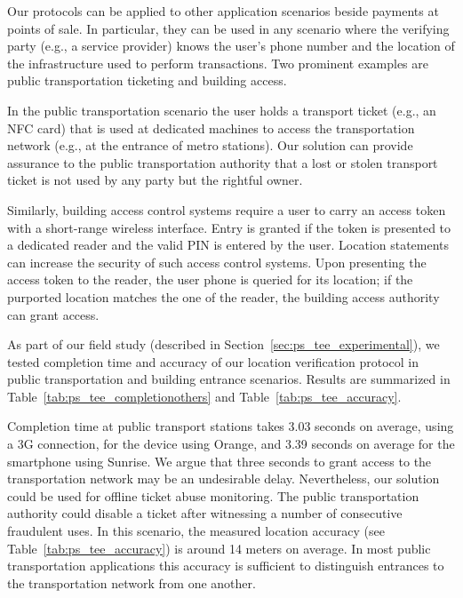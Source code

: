 Our protocols can be applied to other application scenarios beside payments at
points of sale.  In particular, they can be used in any scenario where the
verifying party (e.g., a service provider) knows the user's phone number and the
location of the infrastructure used to perform transactions.  Two prominent
examples are public transportation ticketing and building access.

In the public transportation scenario the user holds a transport ticket (e.g.,
an NFC card) that is used at dedicated machines to access the transportation
network (e.g., at the entrance of metro stations). Our solution can provide
assurance to the public transportation authority that a lost or stolen transport
ticket is not used by any party but the rightful owner.

Similarly, building access control systems require a user to carry an access
token with a short-range wireless interface. Entry is granted if the token is
presented to a dedicated reader and the valid PIN is entered by the user.
Location statements can increase the security of such access control systems.
Upon presenting the access token to the reader, the user phone is queried for
its location; if the purported location matches the one of the reader, the
building access authority can grant access.

As part of our field study (described in Section~\ref{sec:ps_tee_experimental}), we
tested completion time and accuracy of our location verification protocol in
public transportation and building entrance scenarios. Results are summarized in
Table~\ref{tab:ps_tee_completionothers} and Table~\ref{tab:ps_tee_accuracy}.

Completion time at public transport stations takes 3.03 seconds on average,
using a 3G connection, for the device using Orange, and 3.39 seconds on average
for the smartphone using Sunrise. We argue that three seconds to grant access
to the transportation network may be an undesirable delay. Nevertheless, our
solution could be used for offline ticket abuse monitoring. The public
transportation authority could disable a ticket after witnessing a number of
consecutive fraudulent uses. In this scenario, the measured location accuracy
(see Table~\ref{tab:ps_tee_accuracy}) is around 14 meters on average. In most
public transportation applications this accuracy is sufficient to distinguish
entrances to the transportation network from one another.

